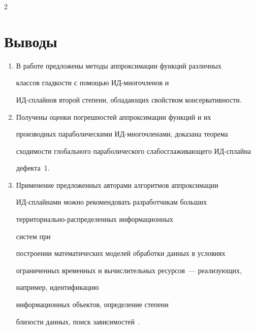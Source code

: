 \begin{multicols}{2}
\vspace*{-6pt}





\section*{Выводы}





\noindent


\begin{enumerate}[1.]


  \item  В работе предложены методы аппроксимации функций различных 


классов гладкости с по\-мощью ИД-многочленов и 


ИД-сплай\-нов второй степени, обладающих свойством консервативности.


  \item Получены оценки погрешностей аппроксимации функций и их 


производных параболическими ИД-мно\-го\-чле\-на\-ми, доказана теорема 


сходимости глобального параболического слабосглаживающего ИД-сплай\-на 


дефекта~1. 


  \item Применение предложенных авторами алгоритмов аппроксимации 


  ИД-сплай\-на\-ми можно рекомендовать разработчикам больших 


  тер\-ри\-то\-ри\-аль\-но-рас\-пре\-де\-лен\-ных информационных %


  сис\-тем при 


построении математических моде\-лей обработки данных в условиях 


ограниченных временных и вычислительных ресурсов~--- реализующих, 


например, идентификацию %


инфор\-ма\-ци\-он\-ных объектов, определение степени 


близости данных, поиск зависимостей~\mbox{\cite{1-kir, 7-kir}}.


\end{enumerate}






\end{multicols}

